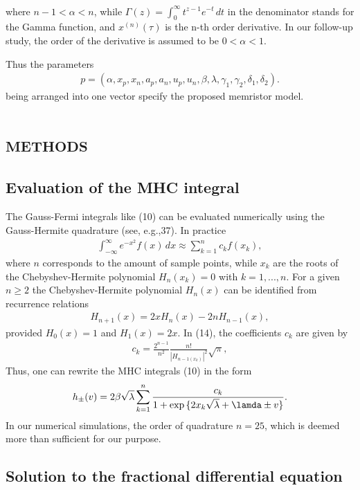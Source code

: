 \documentclass[10pt]{article}
\begin{document}
\begin{multicols}{2}
\begin{align}
\end{align}
where $n-1<\alpha<n$, while $\Gamma (z)= \int_0^\infty t^{z-1} e^{-t} \,dt$ in the denominator stands for the Gamma function, and $x^{(n)} (\tau)$ is the n-th order derivative. In our follow-up study, the order of the derivative is assumed to be $0 < \alpha < 1$. \par
Thus the parameters
\begin{align}
    p = (\alpha, x_p, x_n, a_p, a_n, u_p, u_n, \beta, \lambda, \gamma _1, \gamma _2, \delta_1, \delta_2).
\end{align}
being arranged into one vector specify the proposed memristor model.
{\centering %
\section{\scshape methods}
}
{\centering \subsection{Evaluation of the MHC integral}}
The Gauss-Fermi integrals like (10) can be evaluated
numerically using the Gauss-Hermite quadrature (see,
e.g.,37). In practice
\begin{align}
    \int_{- \infty}^\infty e^{-x^2} f(x) \,dx \approx \sum_{k=1}^n c_k f(x_k),
\end{align}
where $n$ corresponds to the amount of sample points, while $x_k$ are the roots of the Chebyshev-Hermite polynomial $H_n (x_k) = 0$ with $k=1,...,n$. For a given $n \ge 2$ the Chebyshev-Hermite polynomial $H_n (x)$ can be identified
from recurrence relations
\begin{align}
    H_{n+1}(x) = 2xH_n(x) - 2nH_{n-1}(x),
\end{align}
provided $H_0(x)=1$ and $H_1(x) = 2x$. In (14), the coefficients $c_k$ are given by
\begin{align}
    c_k = \frac{2^{n-1}}{n^2} \frac{n!}{|H_{n-1 (x_k)}|^2} \sqrt{\pi},
\end{align}
Thus, one can rewrite the MHC integrals (10) in the form
\begin{align}
    h_{\pm}(v)=2 \beta \sqrt{\lambda} \sum_{k=1}^n \frac{c_k}{1+\exp{\{2x_k \sqrt{\lambda} + \lamda \pm v\}}}.
\end{align}
In our numerical simulations, the order of quadrature
$n = 25$, which is deemed more than sufficient for our purpose.
{\centering \subsection{Solution to the fractional differential equation}}

\end{multicols}
\end{document}

